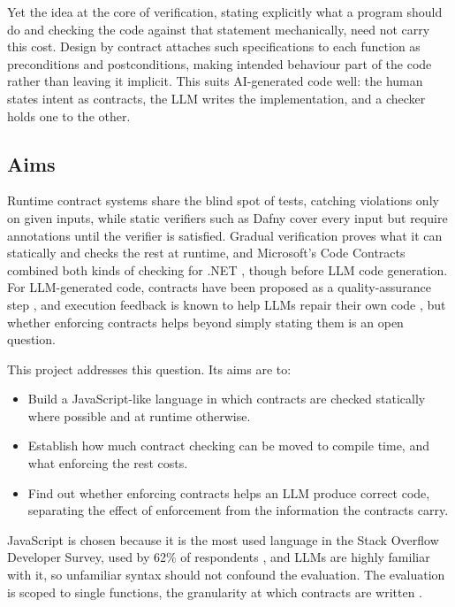 \documentclass[11pt,a4paper,titlepage]{article}
\begin{document}
Yet the idea at the core of verification, stating explicitly what a program should do and checking the code against that statement mechanically, need not carry this cost. Design by contract \parencite{meyer1992dbc} attaches such specifications to each function as preconditions and postconditions, making intended behaviour part of the code rather than leaving it implicit. This suits AI-generated code well: the human states intent as contracts, the LLM writes the implementation, and a checker holds one to the other.

\subsection{Aims}


Runtime contract systems \parencite{findler2002contracts} share the blind spot of tests, catching violations only on given inputs, while static verifiers such as Dafny \parencite{leino2010dafny} cover every input but require annotations until the verifier is satisfied. Gradual verification \parencite{bader2018gradual} proves what it can statically and checks the rest at runtime, and Microsoft's Code Contracts combined both kinds of checking for .NET \parencite{fahndrich2010clousot}, though before LLM code generation. For LLM-generated code, contracts have been proposed as a quality-assurance step \parencite{wang2026vibecontract}, and execution feedback is known to help LLMs repair their own code \parencite{chen2024selfdebug}, but whether enforcing contracts helps beyond simply stating them is an open question.

This project addresses this question. Its aims are to:

\begin{itemize}
  \item Build a JavaScript-like language in which contracts are checked statically where possible and at runtime otherwise.
  \item Establish how much contract checking can be moved to compile time, and what enforcing the rest costs.
  \item Find out whether enforcing contracts helps an LLM produce correct code, separating the effect of enforcement from the information the contracts carry.
\end{itemize}

JavaScript is chosen because it is the most used language in the Stack Overflow Developer Survey, used by 62\% of respondents \parencite{stackoverflow2026}, and LLMs are highly familiar with it, so unfamiliar syntax should not confound the evaluation. The evaluation is scoped to single functions, the granularity at which contracts are written \parencite{meyer1992dbc}.
\end{document}
